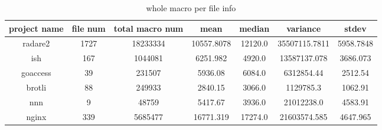 \begin{table}[h]
	\caption{whole macro per file info}
	\label{table:whole_macro_info}	
		\begin{tabular}{ccccccc}
		\hline
		project name & file num & total macro num & mean & median & variance & stdev \\ 
		\hline \hline
		radare2 & 1727 & 18233334 & 10557.8078 & 12120.0 & 35507115.7811 & 5958.7848 \\ 
		\hline
		ish & 167 & 1044081 & 6251.982 & 4920.0 & 13587137.078 & 3686.073 \\ 
		\hline
		goaccess & 39 & 231507 & 5936.08 & 6084.0 & 6312854.44 & 2512.54 \\ 
		\hline
		brotli & 88 & 249933 & 2840.15 & 3066.0 & 1129785.3 & 1062.91 \\ 
		\hline
		nnn & 9 & 48759 & 5417.67 & 3936.0 & 21012238.0 & 4583.91 \\ 
		\hline
		nginx & 339 & 5685477 & 16771.319 & 17274.0 & 21603574.585 & 4647.965 \\ 
		\hline
	\end{tabular}
\end{table}